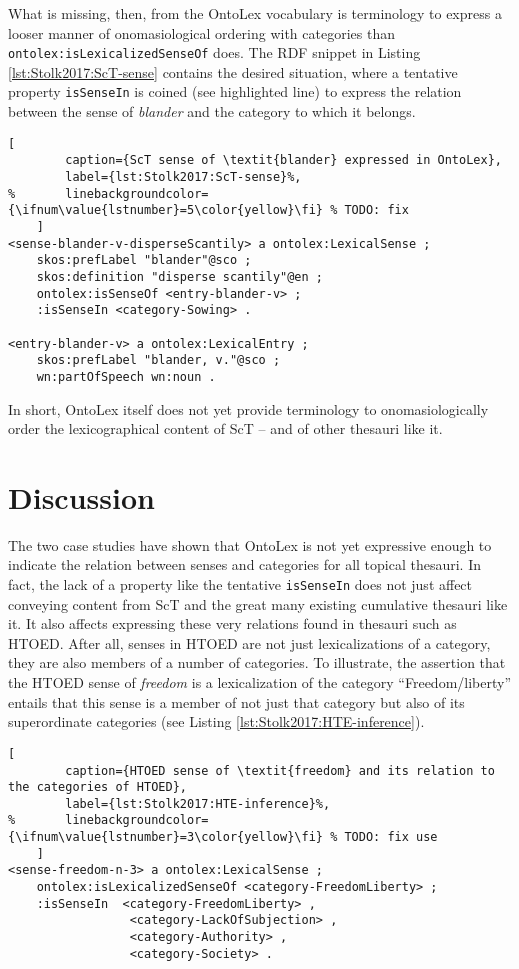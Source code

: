 What is missing, then, from the OntoLex vocabulary is terminology to express a looser manner of onomasiological ordering with categories than \texttt{ontolex:isLexicalizedSenseOf} does. The RDF snippet in Listing \ref{lst:Stolk2017:ScT-sense} contains the desired situation, where a tentative property \texttt{isSenseIn} is coined (see highlighted line) to express the relation between the sense of \textit{blander} and the category to which it belongs.

\noindent
\begin{minipage}[c]{\textwidth}
	\begin{lstlisting}[
		caption={ScT sense of \textit{blander} expressed in OntoLex},
		label={lst:Stolk2017:ScT-sense}%,
%		linebackgroundcolor={\ifnum\value{lstnumber}=5\color{yellow}\fi} % TODO: fix
	]
<sense-blander-v-disperseScantily> a ontolex:LexicalSense ;
	skos:prefLabel "blander"@sco ;
	skos:definition "disperse scantily"@en ;
	ontolex:isSenseOf <entry-blander-v> ;
	:isSenseIn <category-Sowing> .

<entry-blander-v> a ontolex:LexicalEntry ;
	skos:prefLabel "blander, v."@sco ;
	wn:partOfSpeech wn:noun .
	\end{lstlisting}
\end{minipage}

In short, OntoLex itself does not yet provide terminology to onomasiologically order the lexicographical content of ScT -- and of other thesauri like it.


\section{Discussion}

The two case studies have shown that OntoLex is not yet expressive enough to indicate the relation between senses and categories for all topical thesauri. In fact, the lack of a property like the tentative \texttt{isSenseIn} does not just affect conveying content from ScT and the great many existing cumulative thesauri like it. It also affects expressing these very relations found in thesauri such as HTOED. After all, senses in HTOED are not just lexicalizations of a category, they are also members of a number of categories. To illustrate, the assertion that the HTOED sense of \textit{freedom} is a lexicalization of the category ``Freedom/liberty'' entails that this sense is a member of not just that category but also of its superordinate categories (see Listing \ref{lst:Stolk2017:HTE-inference}).

\noindent
\begin{minipage}[c]{\textwidth}
	\begin{lstlisting}[
		caption={HTOED sense of \textit{freedom} and its relation to the categories of HTOED},
		label={lst:Stolk2017:HTE-inference}%,
%		linebackgroundcolor={\ifnum\value{lstnumber}=3\color{yellow}\fi} % TODO: fix use
	]
<sense-freedom-n-3> a ontolex:LexicalSense ;
	ontolex:isLexicalizedSenseOf <category-FreedomLiberty> ;
	:isSenseIn  <category-FreedomLiberty> ,
	             <category-LackOfSubjection> ,
	             <category-Authority> ,
	             <category-Society> .
	\end{lstlisting}
\end{minipage}


